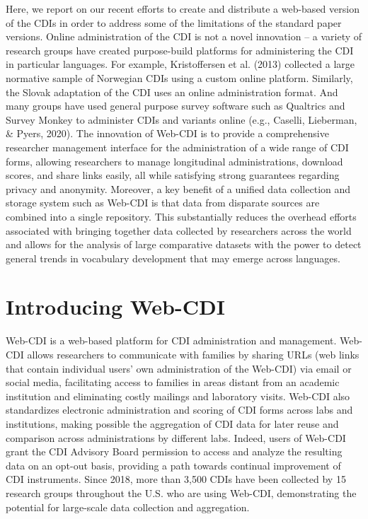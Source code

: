 \documentclass[
  english,
  ,man,floatsintext]{apa6}
\begin{document}
Here, we report on our recent efforts to create and distribute a web-based version of the CDIs in order to address some of the limitations of the standard paper versions. Online administration of the CDI is not a novel innovation -- a variety of research groups have created purpose-build platforms for administering the CDI in particular languages. For example, Kristoffersen et al. (2013) collected a large normative sample of Norwegian CDIs using a custom online platform. Similarly, the Slovak adaptation of the CDI uses an online administration format. And many groups have used general purpose survey software such as Qualtrics and Survey Monkey to administer CDIs and variants online (e.g., Caselli, Lieberman, \& Pyers, 2020). The innovation of Web-CDI is to provide a comprehensive researcher management interface for the administration of a wide range of CDI forms, allowing researchers to manage longitudinal administrations, download scores, and share links easily, all while satisfying strong guarantees regarding privacy and anonymity. Moreover, a key benefit of a unified data collection and storage system such as Web-CDI is that data from disparate sources are combined into a single repository. This substantially reduces the overhead efforts associated with bringing together data collected by researchers across the world and allows for the analysis of large comparative datasets with the power to detect general trends in vocabulary development that may emerge across languages.

\hypertarget{introducing-web-cdi}{%
\section{Introducing Web-CDI}\label{introducing-web-cdi}}

Web-CDI is a web-based platform for CDI administration and management. Web-CDI allows researchers to communicate with families by sharing URLs (web links that contain individual users' own administration of the Web-CDI) via email or social media, facilitating access to families in areas distant from an academic institution and eliminating costly mailings and laboratory visits. Web-CDI also standardizes electronic administration and scoring of CDI forms across labs and institutions, making possible the aggregation of CDI data for later reuse and comparison across administrations by different labs. Indeed, users of Web-CDI grant the CDI Advisory Board permission to access and analyze the resulting data on an opt-out basis, providing a path towards continual improvement of CDI instruments. Since 2018, more than 3,500 CDIs have been collected by 15 research groups throughout the U.S. who are using Web-CDI, demonstrating the potential for large-scale data collection and aggregation.
\end{document}
